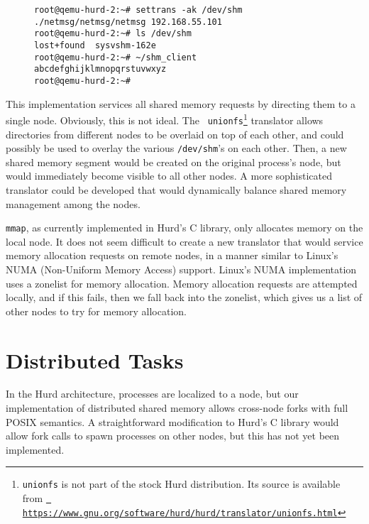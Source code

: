 \documentclass{article}
\begin{document}
\begin{figure}[h]
\begin{mdframed}
\begin{verbatim}
root@qemu-hurd-2:~# settrans -ak /dev/shm ./netmsg/netmsg/netmsg 192.168.55.101
root@qemu-hurd-2:~# ls /dev/shm
lost+found  sysvshm-162e
root@qemu-hurd-2:~# ~/shm_client 
abcdefghijklmnopqrstuvwxyz
root@qemu-hurd-2:~# 
\end{verbatim}
\end{mdframed}
\end{figure}

This implementation services all shared memory requests by directing
them to a single node.  Obviously, this is not ideal.  The {\tt
  unionfs}\footnote{{\tt unionfs} is not part of the stock Hurd
  distribution.  Its source is available from
  \href{https://www.gnu.org/software/hurd/hurd/translator/unionfs.html}{\tt
    https://www.gnu.org/software/hurd/hurd/translator/unionfs.html}}
translator allows directories from different nodes to be overlaid on
top of each other, and could possibly be used to overlay the various
{\tt /dev/shm}'s on each other.  Then, a new shared memory segment
would be created on the original process's node, but would immediately
become visible to all other nodes.  A more sophisticated translator
could be developed that would dynamically balance shared memory
management among the nodes.

{\tt mmap}, as currently implemented in Hurd's C library, only
allocates memory on the local node.  It does not seem difficult to
create a new translator that would service memory allocation requests
on remote nodes, in a manner similar to Linux's NUMA (Non-Uniform
Memory Access) support.  Linux's NUMA implementation uses a zonelist
for memory allocation.  Memory allocation requests are attempted
locally, and if this fails, then we fall back into the zonelist, which
gives us a list of other nodes to try for memory allocation.


\section{Distributed Tasks}

In the Hurd architecture, processes are localized to a node, but our
implementation of distributed shared memory allows cross-node forks
with full POSIX semantics.  A straightforward modification to Hurd's C
library would allow fork calls to spawn processes on other nodes, but
this has not yet been implemented.
\end{document}
